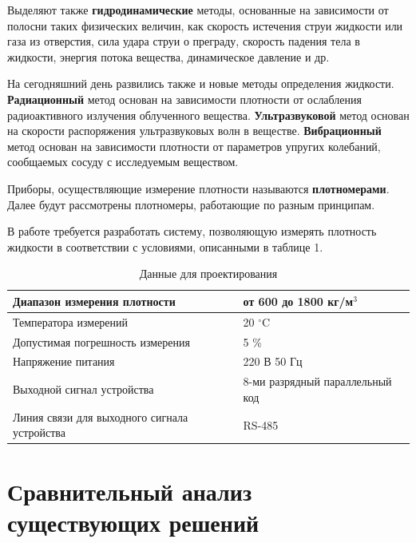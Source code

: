 \documentclass[russian, utf8, 12pt]{eskdtext}
\begin{document}
Выделяют также \textbf{гидродинамические} методы, основанные на зависимости от полосни таких физических величин, как скорость истечения струи жидкости или газа из отверстия, сила удара струи о преграду, скорость падения тела в жидкости, энергия потока вещества, динамическое давление и др. \par

На сегодняшний день развились также и новые методы определения жидкости. \textbf{Радиационный} метод основан на зависимости плотности от ослабления радиоактивного излучения облученного вещества. \textbf{Ультразвуковой} метод основан на скорости распоряжения ультразвуковых волн в веществе. \textbf{Вибрационный} метод основан на зависимости плотности от параметров упругих колебаний, сообщаемых сосуду с исследуемым веществом. \par

Приборы, осуществляющие измерение плотности называются \textbf{плотномерами}. Далее будут рассмотрены плотномеры, работающие по разным принципам.

В работе требуется разработать систему, позволяющую измерять плотность жидкости в соответствии с условиями, описанными в таблице 1.

\begin{table}[h!] 
\renewcommand{\arraystretch}{1.2}
\caption{Данные для проектирования}
\begin{tabular}{|m{}|m{}|}
	\hline
	Диапазон измерения плотности & от 600 до 1800 кг/м$^3$ \\ \hline
	Температора измерений & 20 $^\circ\text{C}$ \\ \hline
	Допустимая погрешность измерения & 5 \% \\ \hline
	Напряжение питания & 220 В 50 Гц \\ \hline
	Выходной сигнал устройства & 8-ми разрядный параллельный код \\ \hline
	Линия связи для выходного сигнала устройства & RS-485 \\ \hline
\end{tabular}
\end{table}

\newpage
%
\section{Сравнительный анализ существующих решений}
\end{document}
